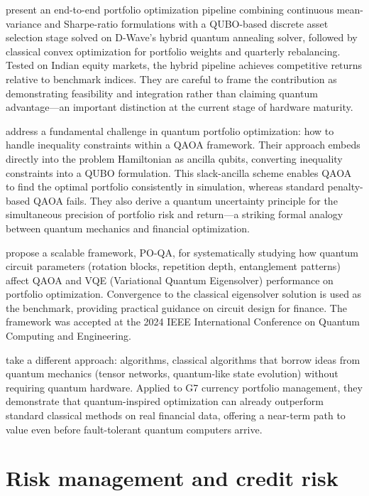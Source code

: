 \citet{morapakula_end--end_2026} present an end-to-end portfolio optimization pipeline combining continuous mean-variance and Sharpe-ratio formulations with a QUBO-based discrete asset selection stage solved on D-Wave's hybrid quantum annealing solver, followed by classical convex optimization for portfolio weights and quarterly rebalancing. Tested on Indian equity markets, the hybrid pipeline achieves competitive returns relative to benchmark indices. They are careful to frame the contribution as demonstrating feasibility and integration rather than claiming quantum advantage---an important distinction at the current stage of hardware maturity.

\citet{thomassin_quantum_2025} address a fundamental challenge in quantum portfolio optimization: how to handle inequality constraints within a QAOA framework. Their approach embeds  directly into the problem Hamiltonian as ancilla qubits, converting inequality constraints into a QUBO formulation. This slack-ancilla scheme enables QAOA to find the optimal portfolio consistently in simulation, whereas standard penalty-based QAOA fails. They also derive a quantum uncertainty principle for the simultaneous precision of portfolio risk and return---a striking formal analogy between quantum mechanics and financial optimization.

\citet{zaman_po-qa_2024} propose a scalable framework, PO-QA, for systematically studying how quantum circuit parameters (rotation blocks, repetition depth, entanglement patterns) affect QAOA and VQE (Variational Quantum Eigensolver) performance on portfolio optimization. Convergence to the classical eigensolver solution is used as the benchmark, providing practical guidance on circuit design for finance. The framework was accepted at the 2024 IEEE International Conference on Quantum Computing and Engineering.

\citet{chou_quantum-inspired_2026} take a different approach:  algorithms, classical algorithms that borrow ideas from quantum mechanics (tensor networks, quantum-like state evolution) without requiring quantum hardware. Applied to G7 currency portfolio management, they demonstrate that quantum-inspired optimization can already outperform standard classical methods on real financial data, offering a near-term path to value even before fault-tolerant quantum computers arrive.

\section{Risk management and credit risk}

